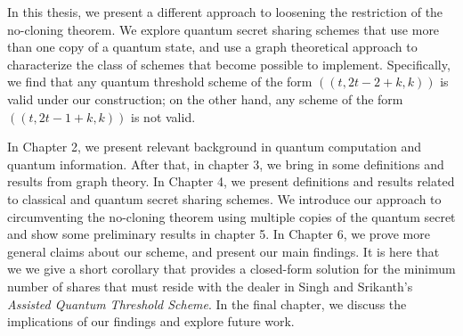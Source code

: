 In this thesis, we present a different approach to loosening the restriction of the no-cloning theorem. We explore quantum secret sharing schemes that use more than one copy of a quantum state, and use a graph theoretical approach to characterize the class of schemes that become possible to implement. Specifically, we find that any quantum threshold scheme of the form $((t,2t-2+k,k))$ is valid under our construction; on the other hand, any scheme of the form $((t,2t-1+k,k))$ is not valid.

In Chapter 2, we present relevant background in quantum computation and quantum information. After that, in chapter 3, we bring in some definitions and results from graph theory. In Chapter 4, we present definitions and results related to classical and quantum secret sharing schemes. We introduce our approach to circumventing the no-cloning theorem using multiple copies of the quantum secret and show some preliminary results in chapter 5. In Chapter 6, we prove more general claims about our scheme, and present our main findings. It is here that we we give a short corollary that provides a closed-form solution for the minimum number of shares that must reside with the dealer in Singh and Srikanth's \textit{Assisted Quantum Threshold Scheme}. In the final chapter, we discuss the implications of our findings and explore future work.